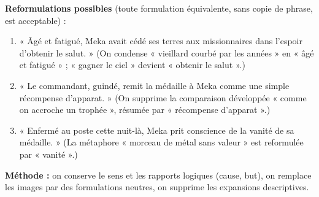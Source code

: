 \documentclass[11pt]{article}
\begin{document}
\begin{corrige}
\textbf{Reformulations possibles} (toute formulation équivalente, sans copie de phrase, est acceptable) :
\begin{enumerate}
\item « Âgé et fatigué, Meka avait cédé ses terres aux missionnaires dans l'espoir d'obtenir le salut. » (On condense « vieillard courbé par les années » en « âgé et fatigué » ; « gagner le ciel » devient « obtenir le salut ».)
\item « Le commandant, guindé, remit la médaille à Meka comme une simple récompense d'apparat. » (On supprime la comparaison développée « comme on accroche un trophée », résumée par « récompense d'apparat ».)
\item « Enfermé au poste cette nuit-là, Meka prit conscience de la vanité de sa médaille. » (La métaphore « morceau de métal sans valeur » est reformulée par « vanité ».)
\end{enumerate}
\textbf{Méthode :} on conserve le sens et les rapports logiques (cause, but), on remplace les images par des formulations neutres, on supprime les expansions descriptives.
\end{corrige}
\end{document}

